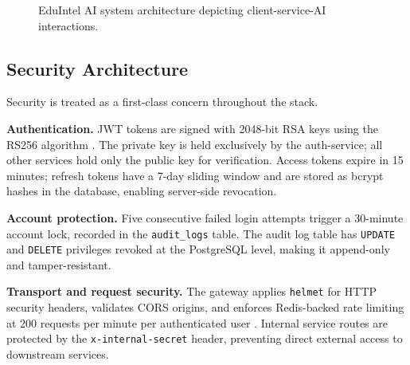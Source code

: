 \documentclass[conference]{IEEEtran}
\begin{document}
\begin{figure}[htbp]
\centering
{}
\caption{EduIntel AI system architecture depicting client-service-AI interactions.}
\label{fig:arch}
\end{figure}

\subsection{Security Architecture}

Security is treated as a first-class concern throughout the stack.

\textbf{Authentication.} JWT tokens are signed with 2048-bit RSA keys using the
RS256 algorithm \cite{jones2015}. The private key is held exclusively by the
auth-service; all other services hold only the public key for verification.
Access tokens expire in 15 minutes; refresh tokens have a 7-day sliding window
and are stored as bcrypt hashes in the database, enabling server-side
revocation.

\textbf{Account protection.} Five consecutive failed login attempts trigger a
30-minute account lock, recorded in the \texttt{audit\_logs} table. The audit
log table has \texttt{UPDATE} and \texttt{DELETE} privileges revoked at the
PostgreSQL level, making it append-only and tamper-resistant.

\textbf{Transport and request security.} The gateway applies \texttt{helmet}
for HTTP security headers, validates CORS origins, and enforces Redis-backed
rate limiting at 200 requests per minute per authenticated user \cite{owasp2021}.
Internal service routes are protected by the \texttt{x-internal-secret} header,
preventing direct external access to downstream services.
\end{document}

